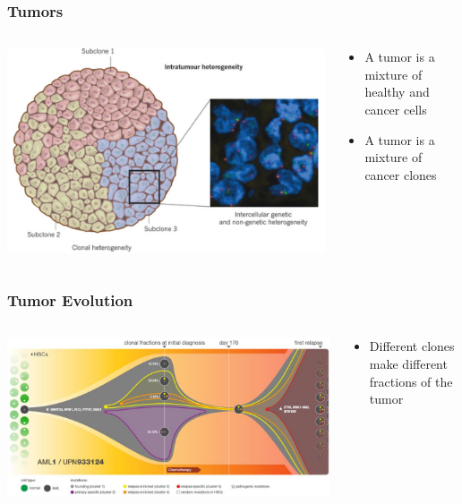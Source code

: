 \begin{frame}
\frametitle{Tumors}
\begin{columns}
\begin{column}{0.75\textwidth}
\centering
\includegraphics[width=0.9\linewidth]{figures/tumor-heterogeneous}
\end{column}
\begin{column}{0.25\textwidth}
\begin{itemize}
\item
A \alert{tumor} is a mixture of healthy and cancer cells
\item
A \alert{tumor} is a mixture of cancer clones
\end{itemize}
\end{column}
\end{columns}
\end{frame}


\begin{frame}
\frametitle{Tumor Evolution}
\begin{columns}
\begin{column}{0.75\textwidth}
\centering
  \includegraphics[width=0.99\linewidth]{figures/clonal}
\end{column}
\begin{column}{0.25\textwidth}
\begin{itemize}
\item Different clones make different fractions of the tumor 
\end{itemize}
\end{column}
\end{columns}
\end{frame}


